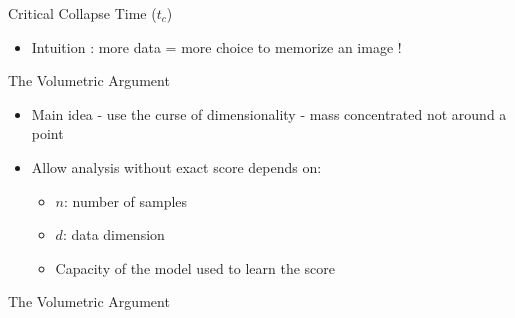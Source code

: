 \documentclass[aspectratio=169]{beamer}
\begin{document}
\begin{frame}{Critical Collapse Time ($t_c$)}
\begin{itemize}
    \item Intuition : more data = more choice to memorize an image !
\end{itemize}
\begin{center}
    \end{center}
\end{frame}


\begin{frame}{The Volumetric Argument}
    \begin{itemize}
        \item Main idea - use the curse of dimensionality - mass concentrated not around a point
    
        \item Allow analysis without exact score depends on:
        \begin{itemize}
            \item $n$: number of samples
            \item $d$: data dimension
            \item Capacity of the model used to learn the score
        \end{itemize}
    \end{itemize}
\end{frame}

\begin{frame}{The Volumetric Argument}
    
    \begin{center}
    \end{center}
\end{frame}
\end{document}

